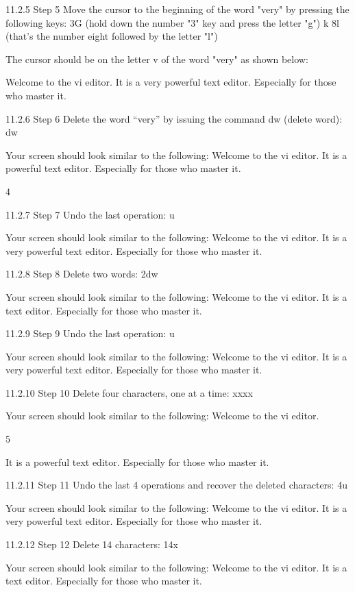 11.2.5 Step 5
Move the cursor to the beginning of the word "very" by pressing the following keys:
3G (hold down the number "3" key and press the letter "g")
k
8l (that's the number eight followed by the letter "l")

The cursor should be on the letter v of the word "very" as shown below:

Welcome to the vi editor.
It is a very powerful text editor.
Especially for those who master it.
~
~

11.2.6 Step 6
Delete the word “very” by issuing the command dw (delete word):
dw

Your screen should look similar to the following:
Welcome to the vi editor.
It is a powerful text editor.
Especially for those who master it.
~

4



11.2.7 Step 7
Undo the last operation:
u

Your screen should look similar to the following:
Welcome to the vi editor.
It is a very powerful text editor.
Especially for those who master it.
~
~

11.2.8 Step 8
Delete two words:
2dw

Your screen should look similar to the following:
Welcome to the vi editor.
It is a text editor.
Especially for those who master it.
~
~

11.2.9 Step 9
Undo the last operation:
u

Your screen should look similar to the following:
Welcome to the vi editor.
It is a very powerful text editor.
Especially for those who master it.
~
~

11.2.10 Step 10
Delete four characters, one at a time:
xxxx

Your screen should look similar to the following:
Welcome to the vi editor.

5



It is a powerful text editor.
Especially for those who master it.
~

11.2.11 Step 11
Undo the last 4 operations and recover the deleted characters:
4u

Your screen should look similar to the following:
Welcome to the vi editor.
It is a very powerful text editor.
Especially for those who master it.
~
~

11.2.12 Step 12
Delete 14 characters:
14x

Your screen should look similar to the following:
Welcome to the vi editor.
It is a text editor.
Especially for those who master it.
~
~

